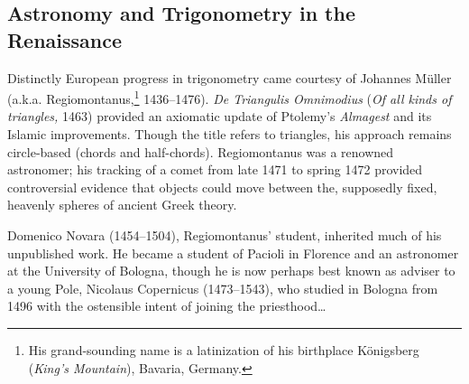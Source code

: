 


\subsection{Astronomy and Trigonometry in the Renaissance}

Distinctly European progress in trigonometry came courtesy of Johannes Müller (a.k.a.{} Regiomontanus,\footnote{His grand-sounding name is a latinization of his birthplace Königsberg (\emph{King's Mountain}), Bavaria, Germany.} 1436--1476). \emph{De Triangulis Omnimodius} (\emph{Of all kinds of triangles,} 1463) provided an axiomatic update of Ptolemy's \emph{Almagest} and its Islamic improvements. Though the title refers to triangles, his approach remains circle-based (chords and half-chords). Regiomontanus was a renowned astronomer; his tracking of a comet from late 1471 to spring 1472 provided controversial evidence that objects could move between the, supposedly fixed, heavenly spheres of ancient Greek theory.\smallbreak

Domenico Novara (1454--1504), Regiomontanus' student, inherited much of his unpublished work. He became a student of Pacioli in Florence and an astronomer at the University of Bologna, though he is now perhaps best known as adviser to a young Pole, Nicolaus Copernicus (1473--1543), who studied in Bologna from 1496 with the ostensible intent of joining the priesthood\ldots\par

